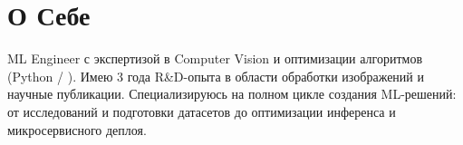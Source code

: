 \documentclass[letterpaper,11pt]{article}
\begin{document}

\section{О Себе}
 \begin{itemize}[leftmargin=0.15in, label={}]
    \small{\item{
     ML Engineer с экспертизой в Computer Vision и оптимизации алгоритмов (Python / \cpp).
     Имею 3 года R\&D-опыта в области обработки изображений и научные публикации.
     Специализируюсь на полном цикле создания ML-решений: от исследований и подготовки датасетов до оптимизации 
     инференса и микросервисного деплоя.
    }} 
 \end{itemize}

\def\currentRole{ML-инженер}


\def\currentProjects{%
  \projectOttoRecsys
  \projectBotDetector
  \projectChangeDetector
}





\end{document}
